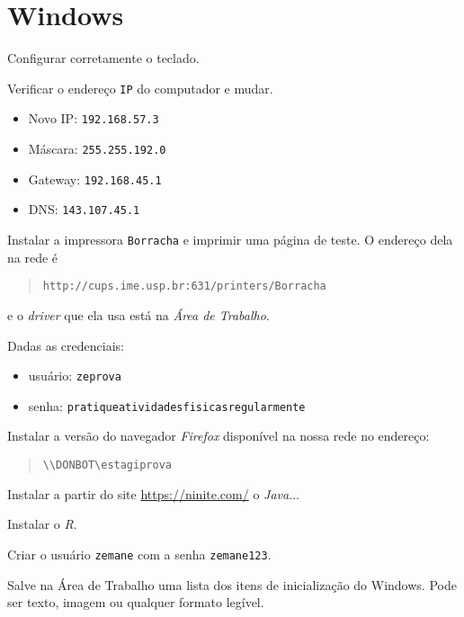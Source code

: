 \section*{Windows}
\begin{questions}

\question
Configurar corretamente o teclado.

\question
Verificar o endereço \verb+IP+ do computador e mudar.
\begin{itemize}
    \item Novo IP: \verb+192.168.57.3+
    \item Máscara: \verb+255.255.192.0+
    \item Gateway: \verb+192.168.45.1+
    \item DNS: \verb+143.107.45.1+
\end{itemize}

\question
Instalar a impressora \verb+Borracha+ e imprimir uma página de teste. O
endereço dela na rede é

\begin{quote}
\verb+http://cups.ime.usp.br:631/printers/Borracha+
\end{quote}

e o \textit{driver} que ela usa está na \textit{Área de Trabalho}.

\question
Dadas as credenciais:
\begin{itemize}
\item usuário: \verb+zeprova+
\item senha: \verb+pratiqueatividadesfisicasregularmente+
\end{itemize}

Instalar a versão do navegador \textit{Firefox} disponível na nossa rede
no endereço:
\begin{quotation}
    \verb+\\DONBOT\estagiprova+
\end{quotation}

\question
Instalar a partir do site \url{https://ninite.com/} o \textit{Java}$\ldots$

\question
Instalar o \textit{R}.

\question
Criar o usuário \verb+zemane+ com a senha \verb+zemane123+.

\question
Salve na Área de Trabalho uma lista dos itens de inicialização do Windows. Pode ser texto, imagem ou qualquer formato legível.

\end{questions}
\newpage


